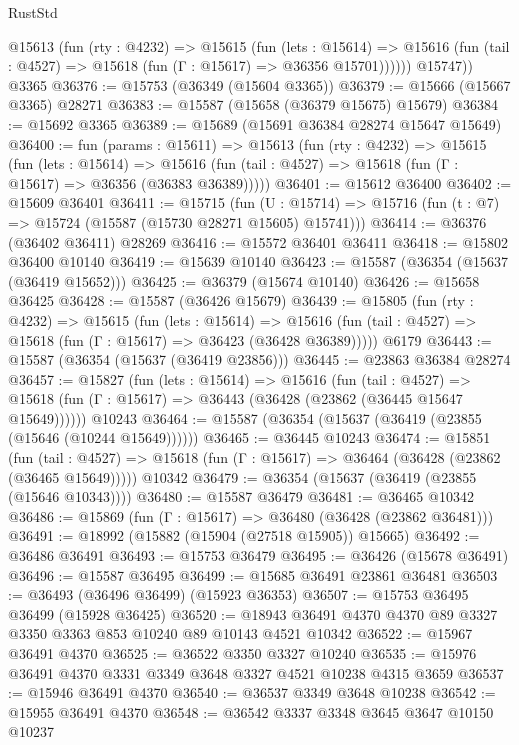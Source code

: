 \begin{lexlean}{RustStd}
\begin{coremodule}
          @15613
            (fun (rty : @4232) =>
            @15615
              (fun (lets : @15614) =>
              @15616 (fun (tail : @4527) => @15618 (fun (Γ : @15617) => @36356 @15701))))))
        @15747))
    @3365
@36376 := @15753 (@36349 (@15604 @3365))
@36379 := @15666 (@15667 @3365) @28271
@36383 := @15587 (@15658 (@36379 @15675) @15679)
@36384 := @15692 @3365
@36389 := @15689 (@15691 @36384 @28274 @15647 @15649)
@36400 := fun (params : @15611) =>
  @15613
    (fun (rty : @4232) =>
    @15615
      (fun (lets : @15614) =>
      @15616 (fun (tail : @4527) => @15618 (fun (Γ : @15617) => @36356 (@36383 @36389)))))
@36401 := @15612 @36400
@36402 := @15609 @36401
@36411 := @15715
    (fun (U : @15714) => @15716 (fun (t : @7) => @15724 (@15587 (@15730 @28271 @15605) @15741)))
@36414 := @36376 (@36402 @36411) @28269
@36416 := @15572 @36401 @36411
@36418 := @15802 @36400 @10140
@36419 := @15639 @10140
@36423 := @15587 (@36354 (@15637 (@36419 @15652)))
@36425 := @36379 (@15674 @10140)
@36426 := @15658 @36425
@36428 := @15587 (@36426 @15679)
@36439 := @15805
    (fun (rty : @4232) =>
    @15615
      (fun (lets : @15614) =>
      @15616 (fun (tail : @4527) => @15618 (fun (Γ : @15617) => @36423 (@36428 @36389)))))
    @6179
@36443 := @15587 (@36354 (@15637 (@36419 @23856)))
@36445 := @23863 @36384 @28274
@36457 := @15827
    (fun (lets : @15614) =>
    @15616
      (fun (tail : @4527) =>
      @15618 (fun (Γ : @15617) => @36443 (@36428 (@23862 (@36445 @15647 @15649))))))
    @10243
@36464 := @15587 (@36354 (@15637 (@36419 (@23855 (@15646 (@10244 @15649))))))
@36465 := @36445 @10243
@36474 := @15851
    (fun (tail : @4527) => @15618 (fun (Γ : @15617) => @36464 (@36428 (@23862 (@36465 @15649)))))
    @10342
@36479 := @36354 (@15637 (@36419 (@23855 (@15646 @10343))))
@36480 := @15587 @36479
@36481 := @36465 @10342
@36486 := @15869 (fun (Γ : @15617) => @36480 (@36428 (@23862 @36481)))
@36491 := @18992 (@15882 (@15904 (@27518 @15905)) @15665)
@36492 := @36486 @36491
@36493 := @15753 @36479
@36495 := @36426 (@15678 @36491)
@36496 := @15587 @36495
@36499 := @15685 @36491 @23861 @36481
@36503 := @36493 (@36496 @36499) (@15923 @36353)
@36507 := @15753 @36495 @36499 (@15928 @36425)
@36520 := @18943 @36491 @4370 @4370 @89 @3327 @3350 @3363 @853 @10240 @89 @10143 @4521 @10342
@36522 := @15967 @36491 @4370
@36525 := @36522 @3350 @3327 @10240
@36535 := @15976 @36491 @4370 @3331 @3349 @3648 @3327 @4521 @10238 @4315 @3659
@36537 := @15946 @36491 @4370
@36540 := @36537 @3349 @3648 @10238
@36542 := @15955 @36491 @4370
@36548 := @36542 @3337 @3348 @3645 @3647 @10150 @10237

\end{coremodule}
\end{lexlean}
